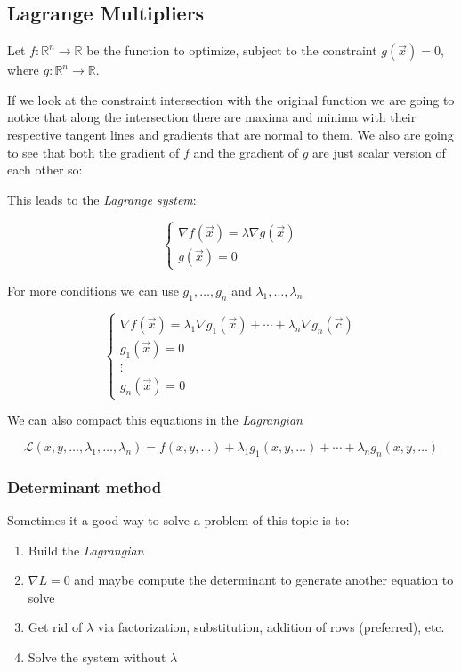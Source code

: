 \subsection{Lagrange Multipliers}

Let \( f : \mathbb{R}^n \to \mathbb{R} \) be the function to optimize, subject to the constraint \( g(\vec{x}) = 0 \), where \( g : \mathbb{R}^n \to \mathbb{R} \).  

If we look at the constraint intersection with the original function we are going to notice that along the intersection
there are maxima and minima with their respective tangent lines
and gradients that are normal to them. We also are going to see that both the gradient of \(f\) and 
the gradient of \(g\) are just scalar version of each other so: 

This leads to the \emph{Lagrange system}:

\[
\begin{cases}
\nabla f(\vec{x}) = \lambda \nabla g(\vec{x}) \\
g(\vec{x}) = 0
\end{cases}
\]

For more conditions  we can use \(g_1, \dots, g_n\) and \(\lambda_1, \dots, \lambda_n\)

\[
\begin{cases}
\nabla f(\vec{x}) = \lambda_1 \nabla g_1(\vec{x}) + \cdots + \lambda_n \nabla g_n(\vec{c}) \\
g_1(\vec{x}) = 0 \\
\vdots \\
g_n(\vec{x}) = 0
\end{cases}
\]


We can also compact this equations in the \emph{Lagrangian}

\[
\mathcal{L}(x,y, \dots, \lambda_1, \dots, \lambda_n) = f(x, y, \dots) + \lambda_1 g_1(x, y, \dots) + \cdots + \lambda_n g_n(x, y, \dots)
\]

\subsubsection{Determinant method}

Sometimes it a good way to solve a problem of this topic is to:

\begin{enumerate}
    \item Build the \emph{Lagrangian}
    \item \(\nabla L = 0\) and maybe compute the determinant to generate another equation to solve
    \item Get rid of \(\lambda\) via factorization, substitution, addition of rows (preferred), etc.
    \item Solve the system without \(\lambda\)
\end{enumerate}

